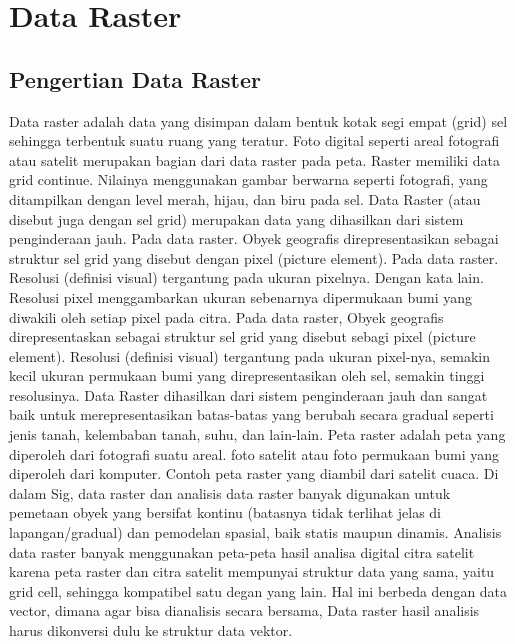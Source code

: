 
\section{Data Raster}
\subsection{Pengertian Data Raster}
Data raster adalah data yang disimpan dalam bentuk kotak segi empat (grid) sel sehingga terbentuk suatu ruang yang 
teratur. Foto digital seperti areal fotografi atau satelit merupakan bagian dari data raster pada peta. 
Raster memiliki data grid continue. Nilainya menggunakan gambar berwarna seperti fotografi, yang ditampilkan dengan 
level merah, hijau, dan biru pada sel. Data Raster (atau disebut juga dengan sel grid) merupakan data yang 
dihasilkan dari sistem penginderaan jauh. Pada data raster. Obyek geografis direpresentasikan sebagai struktur
sel grid yang disebut dengan pixel (picture element). Pada data raster. Resolusi (definisi visual) tergantung
pada ukuran pixelnya. Dengan kata lain. Resolusi pixel menggambarkan ukuran sebenarnya dipermukaan bumi 
yang diwakili oleh setiap pixel pada citra. Pada data raster, Obyek geografis direpresentaskan sebagai struktur sel grid yang disebut sebagi pixel (picture element). Resolusi (definisi visual) tergantung pada ukuran pixel-nya, semakin kecil ukuran permukaan bumi yang direpresentasikan oleh sel, semakin tinggi resolusinya. Data Raster dihasilkan dari sistem penginderaan jauh dan sangat baik untuk merepresentasikan batas-batas yang berubah secara gradual seperti jenis tanah, kelembaban tanah, suhu, dan lain-lain. Peta raster adalah peta yang diperoleh dari fotografi suatu areal. foto satelit atau foto permukaan bumi yang diperoleh dari komputer. Contoh peta raster yang diambil dari satelit cuaca. Di dalam Sig, data raster dan analisis data raster banyak digunakan untuk pemetaan obyek yang bersifat kontinu (batasnya tidak terlihat jelas di lapangan/gradual) dan pemodelan spasial, baik statis maupun dinamis. Analisis data raster banyak menggunakan peta-peta hasil analisa digital citra satelit karena peta raster dan citra satelit mempunyai struktur data yang sama, yaitu grid cell, sehingga kompatibel satu degan yang lain. Hal ini berbeda dengan data vector, dimana agar bisa dianalisis secara bersama, Data raster hasil analisis harus dikonversi dulu ke struktur data vektor. \cite{puntodewo2003sistem}

